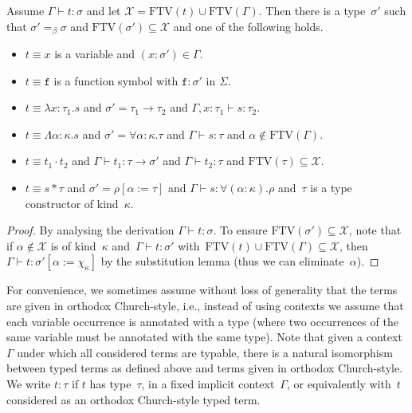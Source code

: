 \documentclass[a4paper,UKenglish,cleveref,autoref,numberwithinsect]{lipics-v2019}
\theoremstyle{definition}
\newcommand{\arrtype}{\rightarrow}
\newcommand{\quant}[2]{\forall #1.#2}
\newcommand{\app}[2]{#1 \cdot #2}
\newcommand{\tapp}[2]{#1 * #2}
\newcommand{\subst}[2]{#1:=#2}
\newcommand{\abs}[2]{\lambda #1.#2}
\newcommand{\tabs}[2]{\Lambda #1.#2}
\newcommand{\FTV}{\mathrm{FTV}}
\newcommand{\Xc}{\mathcal{X}}
\newcommand{\proves}{\vdash}
\begin{document}
\begin{lemma}\label{lem:generation}
  Assume $\Gamma \proves t : \sigma$ and let $\Xc = \FTV(t) \cup
  \FTV(\Gamma)$. Then there is a type~$\sigma'$ such that $\sigma'
  =_\beta \sigma$ and $\FTV(\sigma') \subseteq \Xc$ and one of the
  following holds.
  \begin{itemize}
  \item $t \equiv x$ is a variable and $(x : \sigma') \in \Gamma$.
  \item $t \equiv \mathtt{f}$ is a function symbol with $\mathtt{f} :
    \sigma'$ in $\Sigma$.
  \item $t \equiv \abs{x:\tau_1}{s}$ and
    $\sigma'=\tau_1\arrtype\tau_2$ and $\Gamma, x : \tau_1 \vdash s :
    \tau_2$.
  \item $t \equiv \tabs{\alpha:\kappa}{s}$ and $\sigma' =
    \quant{\alpha:\kappa}{\tau}$ and $\Gamma \vdash s : \tau$ and $\alpha
    \notin \FTV(\Gamma)$.
  \item $t \equiv \app{t_1}{t_2}$ and
    $\Gamma \vdash t_1 : \tau \arrtype \sigma'$ and
    $\Gamma \vdash t_2 : \tau$ and $\FTV(\tau) \subseteq \Xc$.
  \item $t \equiv \tapp{s}{\tau}$ and
    $\sigma' = \rho[\subst{\alpha}{\tau}]$ and
    $\Gamma \vdash s : \quant{(\alpha:\kappa)}{\rho}$ and~$\tau$ is a
    type constructor of kind~$\kappa$.
  \end{itemize}
\end{lemma}

\begin{proof}
  By analysing the derivation $\Gamma \proves t : \sigma$. To
  ensure $\FTV(\sigma') \subseteq \Xc$, note that if
  $\alpha \notin \Xc$
  is of kind~$\kappa$ and~$\Gamma \proves t : \sigma'$
  with~$\FTV(t) \cup \FTV(\Gamma) \subseteq \Xc$, then $\Gamma
  \proves t : \sigma'[\subst{\alpha}{\chi_\kappa}]$ by the
  substitution lemma (thus we can eliminate~$\alpha$).
\end{proof}

For convenience, we sometimes assume without loss of generality that
the terms are given in orthodox Church-style, i.e., instead of using
contexts we assume that each variable occurrence is annotated with a
type (where two occurrences of the same variable must be annotated
with the same type). Note that given a context~$\Gamma$ under which
all considered terms are typable, there is a natural isomorphism
between typed terms as defined above and terms given in orthodox
Church-style. We write $t : \tau$ if $t$ has type~$\tau$, in a fixed
implicit context~$\Gamma$, or equivalently with~$t$ considered as an
orthodox Church-style typed term.
\end{document}

